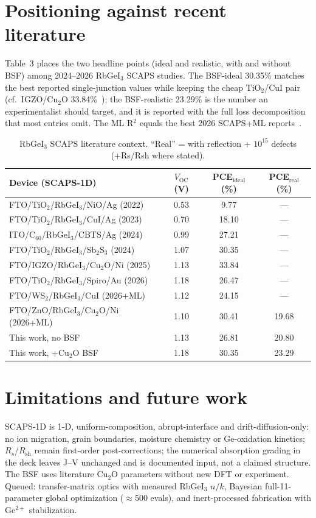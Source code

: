 \documentclass[review]{elsarticle}
\begin{document}
\section{Positioning against recent literature}
Table~3 places the two headline points (ideal and realistic, with and without BSF) among 2024--2026 RbGeI$_{3}$ SCAPS studies. The BSF-ideal 30.35\% matches the best reported single-junction values while keeping the cheap TiO$_{2}$/CuI pair (cf.\ IGZO/Cu$_{2}$O 33.84\%~\cite{rReza}); the BSF-realistic 23.29\% is the number an experimentalist should target, and it is reported with the full loss decomposition that most entries omit. The ML R$^{2}$ equals the best 2026 SCAPS+ML reports~\cite{rJCE,rMA}.

\begin{table}[htbp]
\centering
{\footnotesize\setlength{\tabcolsep}{3pt}
\begin{tabularx}{\textwidth}{Xccc}
\hline
Device (SCAPS-1D) & $V_{\mathrm{OC}}$ (V) & PCE$_{\mathrm{ideal}}$ (\%) & PCE$_{\mathrm{real}}$ (\%)\\
\hline
FTO/TiO$_{2}$/RbGeI$_{3}$/NiO/Ag (2022)~\cite{r14} & 0.53 & 9.77 & ---\\
FTO/TiO$_{2}$/RbGeI$_{3}$/CuI/Ag (2023)~\cite{r13} & 0.70 & 18.10 & ---\\
ITO/C$_{60}$/RbGeI$_{3}$/CBTS/Ag (2024)~\cite{r22} & 0.99 & 27.21 & ---\\
FTO/TiO$_{2}$/RbGeI$_{3}$/Sb$_{2}$S$_{3}$ (2024)~\cite{rRahman} & 1.07 & 30.35 & ---\\
FTO/IGZO/RbGeI$_{3}$/Cu$_{2}$O/Ni (2025)~\cite{rReza} & 1.13 & 33.84 & ---\\
FTO/TiO$_{2}$/RbGeI$_{3}$/Spiro/Au (2026)~\cite{r23pathak} & 1.18 & 26.47 & ---\\
FTO/WS$_{2}$/RbGeI$_{3}$/CuI (2026+ML)~\cite{rJCE} & 1.12 & 24.15 & ---\\
FTO/ZnO/RbGeI$_{3}$/Cu$_{2}$O/Ni (2026+ML)~\cite{rMA} & 1.10 & 30.41 & 19.68\\
This work, no BSF & 1.13 & 26.81 & 20.80\\
This work, +Cu$_{2}$O BSF & 1.18 & 30.35 & 23.29\\
\hline
\end{tabularx}}
\caption{RbGeI$_{3}$ SCAPS literature context. ``Real'' = with reflection + $10^{15}$ defects (+Rs/Rsh where stated).}
\end{table}

\section{Limitations and future work}
SCAPS-1D is 1-D, uniform-composition, abrupt-interface and drift-diffusion-only: no ion migration, grain boundaries, moisture chemistry or Ge-oxidation kinetics; $R_{s}$/$R_{\mathrm{sh}}$ remain first-order post-corrections; the numerical absorption grading in the deck leaves J--V unchanged and is documented input, not a claimed structure. The BSF uses literature Cu$_{2}$O parameters without new DFT or experiment. Queued: transfer-matrix optics with measured RbGeI$_{3}$ $n/k$, Bayesian full-11-parameter global optimization ($\approx$500 evals), and inert-processed fabrication with Ge$^{2+}$ stabilization.
\end{document}
